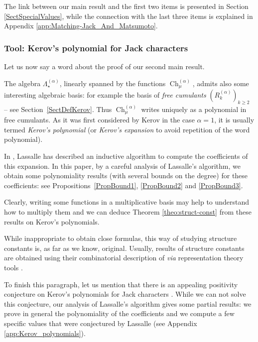 \documentclass[11pt]{amsart}
\theoremstyle{plain}
\theoremstyle{remark}
\newcommand{\Pola}{\Lambda_\star^{(\alpha)}}
\DeclareMathOperator{\Ch}{Ch}
\begin{document}
The link between our main result and the first two items is presented
in Section \ref{SectSpecialValues},
while the connection with the last three items is explained in Appendix 
\ref{app:Matching-Jack_And_Matsumoto}.

\subsubsection{Tool: Kerov's polynomial for Jack characters}
Let us now say a word about the proof of our second main result.

The algebra $\Pola$, linearly spanned by the functions $\Ch_\mu^{(\alpha)}$,
admits also some interesting algebraic basis: for example the basis
of {\em free cumulants} $(R_k^{(\alpha)})_{k \ge 2}$ -- see Section~\ref{SectDefKerov}.
Thus $\Ch_\mu^{(\alpha)}$ writes uniquely as a polynomial in free cumulants.
As it was first considered by Kerov in the case $\alpha=1$,
it is usually termed {\em Kerov's polynomial}
(or {\em Kerov's expansion} to avoid repetition of the word polynomial).

In \cite{Lassalle2009}, Lassalle has described an inductive algorithm
to compute the coefficients of this expansion.
In this paper, by a careful analysis of Lassalle's algorithm, 
we obtain some polynomiality results (with several bounds on the degree) 
for these coefficients: see 
Propositions~\ref{PropBound1}, \ref{PropBound2} and \ref{PropBound3}.

Clearly, writing some functions in a multiplicative basis may help
to understand how to multiply them
and we can deduce Theorem \ref{theo:struct-const} from
these results on Kerov's polynomials.

While inappropriate to obtain close formulas,
this way of studying structure constants is, as far as we know, original.
Usually, results of structure constants are obtained using their 
combinatorial description of {\em via} representation theory tools 
\cite{FarahatHigmanCentreQSn,GouldenJacksonMapsZonal,IvanovKerovPartialPermutations,GoupilSchaefferStructureCoef,Tout-Structure-constant-S2n-Hn}.

To finish this paragraph, let us mention that there is an appealing
positivity conjecture on Kerov's polynomials
for Jack characters \cite[Conjecture 1.2]{Lassalle2009}.
While we can not solve this conjecture, our analysis of Lassalle's algorithm
gives some partial results: we prove in general the polynomiality of
the coefficients and we compute a few specific values that were
conjectured by Lassalle (see Appendix \ref{app:Kerov_polynomials}).
\end{document}
